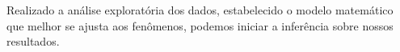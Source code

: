  
\hspace*{1.25 cm} Realizado a análise exploratória dos dados, estabelecido o modelo matemático que melhor se ajusta aos  fenômenos, podemos iniciar a inferência sobre nossos resultados. 
%   

